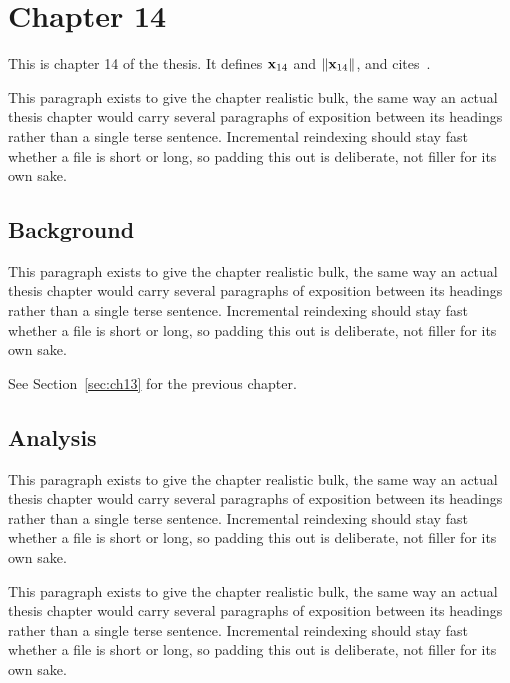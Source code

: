 \section{Chapter 14}
\label{sec:ch14}

This is chapter 14 of the thesis. It defines $\mathbf{x}_{14}$ and $\lVert \mathbf{x}_{14} \rVert$, and cites~\cite{ref1}.

This paragraph exists to give the chapter realistic bulk, the same way an actual thesis chapter would carry several paragraphs of exposition between its headings rather than a single terse sentence. Incremental reindexing should stay fast whether a file is short or long, so padding this out is deliberate, not filler for its own sake.

\subsection{Background}
\label{sec:ch14:background}

This paragraph exists to give the chapter realistic bulk, the same way an actual thesis chapter would carry several paragraphs of exposition between its headings rather than a single terse sentence. Incremental reindexing should stay fast whether a file is short or long, so padding this out is deliberate, not filler for its own sake.

See Section~\ref{sec:ch13} for the previous chapter.

\subsection{Analysis}
\label{sec:ch14:analysis}

This paragraph exists to give the chapter realistic bulk, the same way an actual thesis chapter would carry several paragraphs of exposition between its headings rather than a single terse sentence. Incremental reindexing should stay fast whether a file is short or long, so padding this out is deliberate, not filler for its own sake.

This paragraph exists to give the chapter realistic bulk, the same way an actual thesis chapter would carry several paragraphs of exposition between its headings rather than a single terse sentence. Incremental reindexing should stay fast whether a file is short or long, so padding this out is deliberate, not filler for its own sake.

